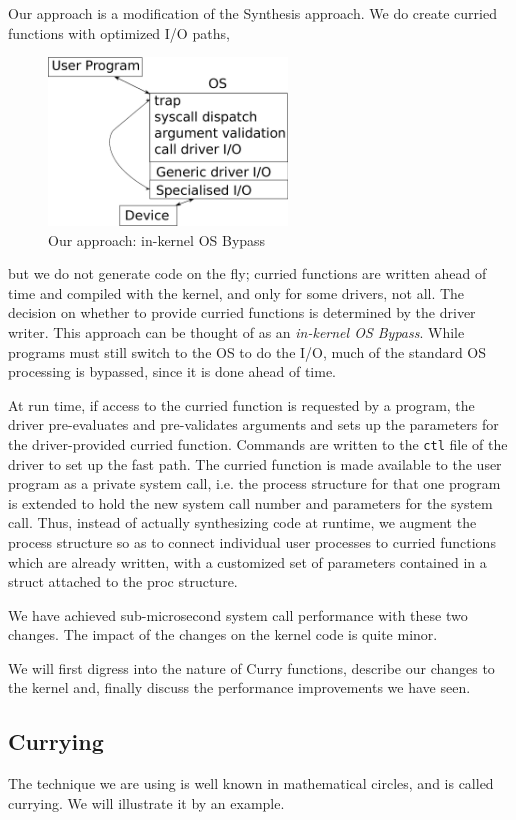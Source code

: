 \documentclass[a4,10pt,preprint]{sigplanconf}
\begin{document}
Our approach is a modification of the Synthesis approach. We do create curried functions with optimized I/O paths, 
\begin{figure}
\includegraphics[width=2.5in]{curry}
\caption{\label{curry}Our approach: in-kernel OS Bypass}
\end{figure}
but we do not generate code on the fly; curried functions are written ahead of time and compiled with the kernel, and only for some drivers, not all. The decision 
on whether to provide curried functions is determined by the driver writer. 
This approach can be thought of as an {\em in-kernel OS Bypass}. While programs must still switch to the OS to do the I/O, much of the standard OS processing is bypassed, since it is done ahead of time. 

At run time, if access to the curried function is requested by a program, 
the driver  pre-evaluates and pre-validates arguments and sets up the parameters for the driver-provided curried function. 
Commands are written to the {\tt ctl} file of the driver to set up the fast path. 
The 
curried function is made available to the user program as a private system call, i.e. the process structure for 
that one program is extended to hold the new system call number and parameters for the system call. 
Thus, instead of actually synthesizing code at runtime, we augment the process structure so as to 
connect individual user processes to curried 
functions which are already written, with a customized set of parameters contained in a struct attached to the proc structure. 

We have achieved sub-microsecond system call performance with these two changes. The impact of the 
changes on the kernel code is quite minor. 

We will first digress into the nature of Curry functions, describe our changes to the kernel and, finally discuss the 
performance improvements we have seen. 

\subsection{Currying}
The technique we are using is well known in mathematical circles, and is called currying. 
We will illustrate it by an example. 
\end{document}
